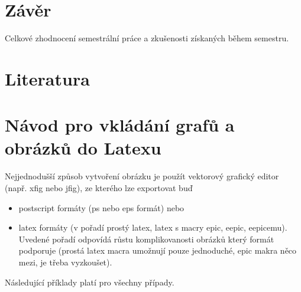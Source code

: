 \documentclass[11pt]{article}
\begin{document}






\section{Závěr}

Celkové zhodnocení semestrální práce a zkušenosti získaných během
semestru.

\section{Literatura}

\appendix

\section{Návod pro vkládání grafů a obrázků do Latexu}

Nejjednodušší způsob vytvoření obrázku je použít vektorový grafický
editor (např. xfig nebo jfig), ze kterého lze exportovat buď
\begin{itemize}
\item postscript formáty (ps nebo eps formát) nebo
\item latex formáty (v pořadí prostý latex, latex s macry epic, eepic, eepicemu). Uvedené pořadí odpovídá růstu
komplikovanosti obrázků který formát podporuje (prostá latex macra
umožnují pouze jednoduché, epic makra něco mezi, je třeba
vyzkoušet).

\end{itemize}
Následující příklady platí pro všechny případy.
\end{document}
